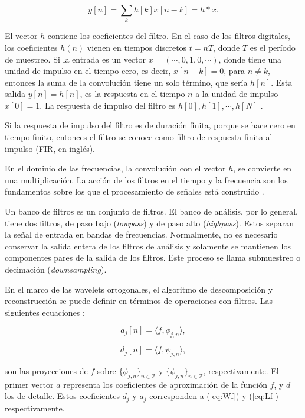 \begin{equation}
	y[n] = \sum_{k} h[k]x[n-k] = h * x.
\end{equation}

El vector $h$ contiene los coeficientes del filtro. En el caso de los filtros digitales, los 
coeficientes $h(n)$ vienen en tiempos discretos $t=nT$, donde $T$ es el período de muestreo. 
Si la entrada es un vector $x=(\cdots,0,1,0,\cdots)$, donde tiene una unidad de impulso en el tiempo cero,
es decir, $x[n-k]=0$, para $n \neq k$, entonces la suma de la convolución tiene un solo término, que sería
$h[n]$. Esta salida $y[n]=h[n]$, es la respuesta en el tiempo $n$ a la unidad de impulso
$x[0]=1$. La respuesta de impulso del filtro es $h[0],h[1],\cdots,h[N]$ \cite{Gilbert95}.

Si la respuesta de impulso del filtro es de duración finita, porque se hace cero en tiempo finito, entonces
el filtro se conoce como filtro de respuesta finita al impulso (FIR, en inglés).

En el dominio de las frecuencias, la convolución con el vector $h$, se convierte en una multiplicación. La 
acción de los filtros en el tiempo y la frecuencia son los fundamentos sobre los que el procesamiento de señales
está construido \cite{Gilbert95}.

Un banco de filtros es un conjunto de filtros. El banco de análisis, por lo general, tiene dos filtros, 
de paso bajo (\textit{lowpass}) y de paso alto (\textit{highpass}). Estos separan la señal 
de entrada en bandas de frecuencias. Normalmente, no es necesario
conservar la salida entera de los filtros de análisis y solamente se mantienen los componentes pares de la salida
de los filtros. Este proceso se llama submuestreo o decimación (\textit{downsampling}). 

En el marco de las wavelets ortogonales, el algoritmo de descomposición y reconstrucción se puede definir
en términos de operaciones con filtros. Las siguientes ecuaciones \cite{Mallat2008}:

\begin{equation}
	a_j[n] = \langle f,\phi_{j,n} \rangle,
\end{equation}

\begin{equation}
	d_j[n] = \langle f,\psi_{j,n} \rangle,
\end{equation}

\noindent son las proyecciones de $f$ sobre $\{\phi_{j,n}\}_{n\in \mathbb{Z}}$ y $\{\psi_{j,n}\}_{n\in \mathbb{Z}}$, 
respectivamente. El primer vector $a$ representa los coeficientes de aproximación de la función $f$,
y $d$ los de detalle. Estos coeficientes $d_j$ y $a_j$ corresponden a (\ref{eq:Wf}) y (\ref{eq:Lf}) 
respectivamente. 

